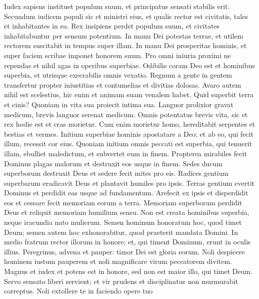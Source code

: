 \begin{biblechapter}
\begin{biblechapter}
\begin{biblechapter}
\begin{biblechapter}
\begin{biblechapter}
\begin{biblechapter}
\begin{biblechapter}
\begin{biblechapter}
\begin{biblechapter}
\begin{biblechapter}
\verse Iudex sapiens instituet populum suum,
 et principatus sensati stabilis erit.
 \verse Secundum iudicem populi sic et ministri eius,
 et qualis rector est civitatis, tales et inhabitantes in ea.
 \verse Rex insipiens perdet populum suum,
 et civitates inhabitabuntur per sensum potentium.
 \verse In manu Dei potestas terrae,
 et utilem rectorem suscitabit in tempus super illam.
 \verse In manu Dei prosperitas hominis,
 et super faciem scribae imponet honorem suum.
 \verse Pro omni iniuria proximi ne rependas
 et nihil agas in operibus superbiae.
 \verse Odibilis coram Deo est et hominibus superbia,
 et utrisque execrabilis omnis vexatio.
 \verse Regnum a gente in gentem transfertur
 propter iniustitias et contumelias et divitias dolosas.
 \verse Avaro autem nihil est scelestius,
 hic enim et animam suam venalem habet.
 \verse Quid superbit terra et cinis?
 Quoniam in vita sua proiecit intima sua.
 \verse Languor prolixior gravat medicum,
 brevis languor serenat medicum.
 \verse Omnis potentatus brevis vita,
 sic et rex hodie est et cras morietur.
 \verse Cum enim morietur homo,
 hereditabit serpentes et bestias et vermes.
 \verse Initium superbiae hominis apostatare a Deo;
 \verse et ab eo, qui fecit illum, recessit cor eius.
 Quoniam initium omnis peccati est superbia,
 qui tenuerit illam, ebulliet maledictum,
 et subvertet eum in finem.
 \verse Propterea mirabiles fecit Dominus plagas malorum
 et destruxit eos usque in finem.
 \verse Sedes ducum superborum destruxit Deus
 et sedere fecit mites pro eis.
 \verse Radices gentium superbarum eradicavit Deus
 et plantavit humiles pro ipsis.
 \verse Terras gentium evertit Dominus
 et perdidit eas usque ad fundamentum.
 \verse Arefecit ex ipsis et disperdidit eos
 et cessare fecit memoriam eorum a terra.
 \verse Memoriam superborum perdidit Deus
 et reliquit memoriam humilium sensu.
 \verse Non est creata hominibus superbia,
 neque iracundia nato mulierum.
 \verse Semen hominum honoratum hoc,
 quod timet Deum;
 semen autem hoc exhonorabitur,
 quod praeterit mandata Domini.
 \verse In medio fratrum rector illorum in honore;
 et, qui timent Dominum, erunt in oculis illius.
 \verse Peregrinus, advena et pauper:
 timor Dei est gloria eorum.
 \verse Noli despicere hominem iustum pauperem
 et noli magnificare virum peccatorem divitem.
 \verse Magnus et iudex et potens est in honore,
 sed non est maior illo, qui timet Deum.
 \verse Servo sensato liberi servient;
 et vir prudens et disciplinatus non murmurabit correptus.
 \verse Noli extollere te in faciendo opere tuo

\end{biblechapter}
\end{biblechapter}
\end{biblechapter}
\end{biblechapter}
\end{biblechapter}
\end{biblechapter}
\end{biblechapter}
\end{biblechapter}
\end{biblechapter}
\end{biblechapter}
